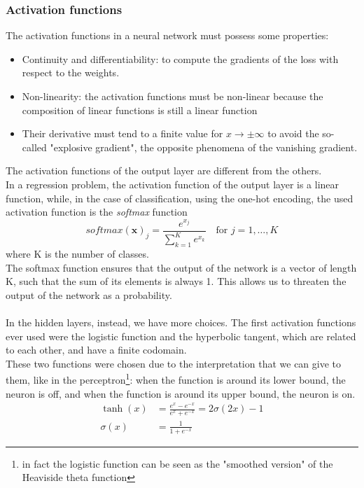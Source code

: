 \subsubsection*{Activation functions}
The activation functions in a neural network must possess some properties:
\begin{itemize}
    \item Continuity and differentiability: to compute the gradients of the loss with respect to the weights.
    \item Non-linearity: the activation functions must be non-linear because the composition of linear functions is still a linear function
    \item Their derivative must tend to a finite value for $x \to \pm \infty$ to avoid the so-called "explosive gradient", the opposite phenomena of the vanishing gradient.
\end{itemize}
The activation functions of the output layer are different from the others.\\
In a regression problem, the activation function of the output layer is a linear function, while, in the case of classification, using the one-hot encoding, the used activation function is the \textit{softmax} function
\begin{equation}
    {\textit{softmax} (\mathbf {x} )_{j}={\frac {e^{x_{j}}}{\sum _{k=1}^{K}e^{x_{k}}}}} \quad \text{for } j=1,\dots,K
\end{equation}
where K is the number of classes.\\
The softmax function ensures that the output of the network is a vector of length K, such that the sum of its elements is always 1. This allows us to threaten the output of the network as a probability.\\
\\
In the hidden layers, instead, we have more choices. The first activation functions ever used were the logistic function and the hyperbolic tangent, which are related to each other, and have a finite codomain.\\
These two functions were chosen due to the interpretation that we can give to them, like in the perceptron\footnote{in fact the logistic function can be seen as the "smoothed version" of the Heaviside theta function}: when the function is around its lower bound, the neuron is off, and when the function is around its upper bound, the neuron is on.
\begin{align}
    \tanh(x)&= \frac{e^x-e^{-x}}{e^x+e^{-x}}=2\sigma(2x)-1  \\
    \sigma(x)&=\frac{1}{1+e^{-x}} 
\end{align}
